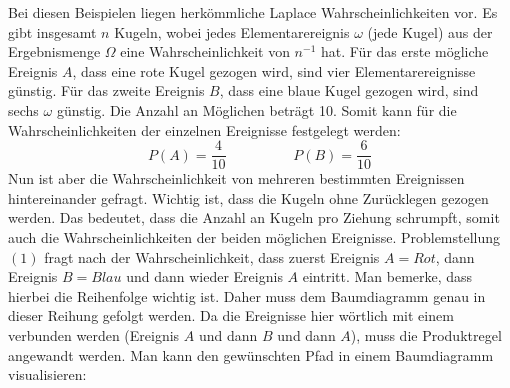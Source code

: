 Bei diesen Beispielen liegen herk\"{o}mmliche Laplace Wahrscheinlichkeiten vor. Es gibt insgesamt $n$ Kugeln, wobei jedes Elementarereignis $\omega$ (jede Kugel) aus der Ergebnismenge $\Omega$ eine Wahrscheinlichkeit von $n^{-1}$ hat. F\"{u}r das erste m\"{o}gliche Ereignis $A$, dass eine rote Kugel gezogen wird, sind vier Elementarereignisse g\"{u}nstig. F\"{u}r das zweite Ereignis $B$, dass eine blaue Kugel gezogen wird, sind sechs $\omega$ g\"{u}nstig. Die Anzahl an M\"{o}glichen betr\"{a}gt 10. Somit kann f\"{u}r die Wahrscheinlichkeiten der einzelnen Ereignisse festgelegt werden: $$P(A) = \frac{4}{10} \hspace{2cm} P(B) = \frac{6}{10}$$ Nun ist aber die Wahrscheinlichkeit von mehreren bestimmten Ereignissen hintereinander gefragt. Wichtig ist, dass die Kugeln ohne Zur\"{u}cklegen gezogen werden. Das bedeutet, dass die Anzahl an Kugeln pro Ziehung schrumpft, somit auch die Wahrscheinlichkeiten der beiden m\"{o}glichen Ereignisse. Problemstellung $(1)$ fragt nach der Wahrscheinlichkeit, dass zuerst Ereignis $A = Rot$, dann Ereignis $B = Blau$ und dann wieder Ereignis $A$ eintritt. Man bemerke, dass hierbei die Reihenfolge wichtig ist. Daher muss dem Baumdiagramm genau in dieser Reihung gefolgt werden. Da die Ereignisse hier w\"{o}rtlich mit einem  verbunden werden (Ereignis $A$ und dann $B$ und dann $A$), muss die Produktregel angewandt werden. Man kann den gew\"{u}nschten Pfad in einem Baumdiagramm visualisieren:

